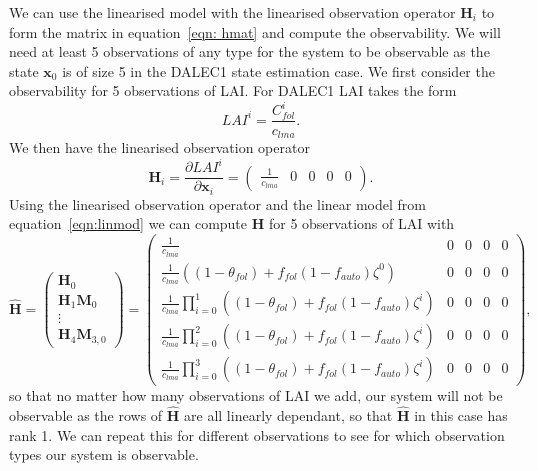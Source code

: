 \documentclass[11pt]{article}
\begin{document}
We can use the linearised model with the linearised observation operator $\textbf{H}_{i}$ to form the matrix in equation~\eqref{eqn: hmat} and compute the observability. We will need at least 5 observations of any type for the system to be observable as the state $\textbf{x}_0$ is of size 5 in the DALEC1 state estimation case. We first consider the observability for 5 observations of LAI. For DALEC1 LAI takes the form
\begin{equation}
LAI^{i} = \frac{C_{fol}^{i}}{c_{lma}}.
\end{equation}
We then have the linearised observation operator
\begin{equation}
\textbf{H}_{i} = \frac{\partial LAI^{i}}{\partial \textbf{x}_{i}} =
\begin{pmatrix}
\frac{1}{c_{lma}} & 0 & 0 & 0 & 0
\end{pmatrix}.
\end{equation}
Using the linearised observation operator and the linear model from equation~\ref{eqn:linmod} we can compute $\hat{\textbf{H}}$ for 5 observations of LAI with
\begin{dmath}
\hat{\mathbf{H}} =
\begin{pmatrix}
\mathbf{H}_0 \\
\mathbf{H}_1\mathbf{M}_0 \\
\vdots \\
\mathbf{H}_{4}\mathbf{M}_{3,0}

\end{pmatrix}
=
\begin{pmatrix}
\frac{1}{c_{lma}} & 0 & 0 & 0 & 0 \\
\frac{1}{c_{lma}}((1-\theta_{fol})+f_{fol}(1-f_{auto})\zeta^0) & 0 & 0 & 0 & 0 \\
\frac{1}{c_{lma}}\prod_{i=0}^{1}((1-\theta_{fol})+f_{fol}(1-f_{auto})\zeta^i) & 0 & 0 & 0 & 0 \\
\frac{1}{c_{lma}}\prod_{i=0}^{2}((1-\theta_{fol})+f_{fol}(1-f_{auto})\zeta^i) & 0 & 0 & 0 & 0 \\
\frac{1}{c_{lma}}\prod_{i=0}^{3}((1-\theta_{fol})+f_{fol}(1-f_{auto})\zeta^i) & 0 & 0 & 0 & 0
\end{pmatrix},
\end{dmath}
so that no matter how many observations of LAI we add, our system will not be observable as the rows of $\hat{\textbf{H}}$ are all linearly dependant, so that $\hat{\textbf{H}}$ in this case has rank 1. We can repeat this for different observations to see for which observation types our system is observable. 
\end{document}
